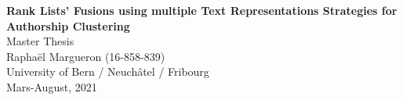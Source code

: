 \begin{titlepage}
  \vspace*{\fill}
  \begin{center}
    {\LARGE \textbf{Rank Lists' Fusions using multiple Text Representations Strategies for Authorship Clustering}}
    \\[0.5cm]
    {\large Master Thesis}
    \\[8.0cm]
    {\large Raphaël Margueron (16-858-839)}
    \\[0.5cm]
    {\large University of Bern / Neuchâtel / Fribourg}
    \\[0.5cm]
    {\large Mars-August, 2021}
    \\[0.5cm]
  \end{center}
  \vspace*{\fill}
\end{titlepage}
